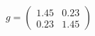 \documentclass[preview]{standalone}
\begin{document}
\begin{align*}
g = \begin{pmatrix} 1.45 & 0.23 \\ 0.23 & 1.45 \end{pmatrix}
\end{align*}
\end{document}
